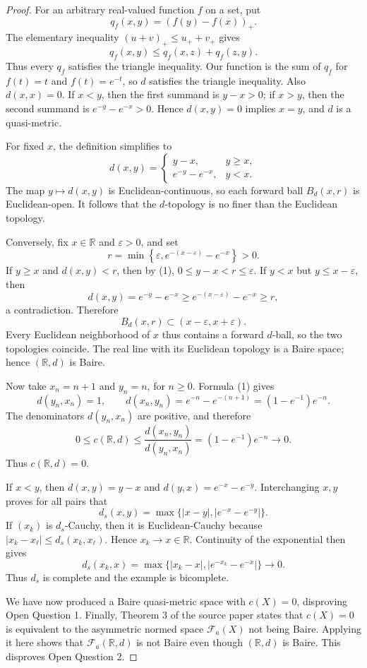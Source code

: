 \documentclass[11pt]{article}
\newcommand{\R}{\mathbb R}
\newcommand{\Fa}{\mathcal F_a}
\newcommand{\pos}[1]{\left(#1\right)_+}
\begin{document}
\begin{proof}
For an arbitrary real-valued function $f$ on a set, put
\[
 q_f(x,y)=\pos{f(y)-f(x)}.
\]
The elementary inequality \((u+v)_+\le u_++v_+\) gives
\[
 q_f(x,y)\le q_f(x,z)+q_f(z,y).
\]
Thus every $q_f$ satisfies the triangle inequality. Our function is the sum
of $q_f$ for $f(t)=t$ and $f(t)=e^{-t}$, so $d$ satisfies the triangle
inequality. Also $d(x,x)=0$. If $x<y$, then the first summand is $y-x>0$;
if $x>y$, then the second summand is $e^{-y}-e^{-x}>0$. Hence
$d(x,y)=0$ implies $x=y$, and $d$ is a quasi-metric.

For fixed $x$, the definition simplifies to
\[
 d(x,y)=
 \begin{cases}
 y-x,&y\ge x,\\
 e^{-y}-e^{-x},&y<x.
 \end{cases}\tag{1}
\]
The map $y\mapsto d(x,y)$ is Euclidean-continuous, so each forward ball
$B_d(x,r)$ is Euclidean-open. It follows that the $d$-topology is no finer
than the Euclidean topology.

Conversely, fix $x\in\R$ and \(\varepsilon>0\), and set
\[
 r=\min\left\{\varepsilon,
 e^{-(x-\varepsilon)}-e^{-x}\right\}>0.
\]
If $y\ge x$ and $d(x,y)<r$, then by (1),
$0\le y-x<r\le\varepsilon$. If $y<x$ but
$y\le x-\varepsilon$, then
\[
 d(x,y)=e^{-y}-e^{-x}
 \ge e^{-(x-\varepsilon)}-e^{-x}\ge r,
\]
a contradiction. Therefore
\[
 B_d(x,r)\subset(x-\varepsilon,x+\varepsilon).
\]
Every Euclidean neighborhood of $x$ thus contains a forward $d$-ball, so
the two topologies coincide. The real line with its Euclidean topology is a
Baire space; hence \((\R,d)\) is Baire.

Now take $x_n=n+1$ and $y_n=n$, for $n\ge0$. Formula (1) gives
\[
 d(y_n,x_n)=1,
 \qquad
 d(x_n,y_n)=e^{-n}-e^{-(n+1)}=(1-e^{-1})e^{-n}.
\]
The denominators $d(y_n,x_n)$ are positive, and therefore
\[
 0\le c(\R,d)
 \le \frac{d(x_n,y_n)}{d(y_n,x_n)}
 =(1-e^{-1})e^{-n}\longrightarrow0.
\]
Thus $c(\R,d)=0$.

If $x<y$, then $d(x,y)=y-x$ and
$d(y,x)=e^{-x}-e^{-y}$. Interchanging $x,y$ proves for all pairs that
\[
 d_s(x,y)=\max\{|x-y|,|e^{-x}-e^{-y}|\}.
\]
If \((x_k)\) is $d_s$-Cauchy, then it is Euclidean-Cauchy because
$|x_k-x_\ell|\le d_s(x_k,x_\ell)$. Hence $x_k\to x\in\R$. Continuity of
the exponential then gives
\[
 d_s(x_k,x)=
 \max\{|x_k-x|,|e^{-x_k}-e^{-x}|\}\longrightarrow0.
\]
Thus $d_s$ is complete and the example is bicomplete.

We have now produced a Baire quasi-metric space with $c(X)=0$, disproving
Open Question 1. Finally, Theorem 3 of the source paper \cite{Bachir} states
that $c(X)=0$ is equivalent to the asymmetric normed space \(\Fa(X)\) not
being Baire. Applying it here shows that \(\Fa(\R,d)\) is not Baire even though
\((\R,d)\) is Baire. This disproves Open Question 2.
\end{proof}
\end{document}
